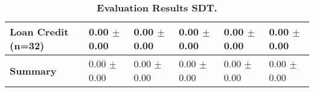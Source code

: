\begin{table}[htb]
{\begin{tabular}{llllll}
\textbf{Loan Credit (n=32)                       } &  \phantom{0}0.00 $\pm$ \phantom{0}0.00 &             \phantom{0}0.00 $\pm$ \phantom{0}0.00 &  \phantom{0}0.00 $\pm$ \phantom{0}0.00 &  \phantom{0}0.00 $\pm$ \phantom{0}0.00 &  \phantom{0}0.00 $\pm$ \phantom{0}0.00 \\
\midrule
\textbf{Summary                                  } &  \phantom{0}0.00 $\pm$ \phantom{0}0.00 &             \phantom{0}0.00 $\pm$ \phantom{0}0.00 &  \phantom{0}0.00 $\pm$ \phantom{0}0.00 &  \phantom{0}0.00 $\pm$ \phantom{0}0.00 &  \phantom{0}0.00 $\pm$ \phantom{0}0.00 \\
\bottomrule
\end{tabular}%
}
\caption{\textbf{Evaluation Results SDT.}}
\label{tab:eval-results}
\end{table}


